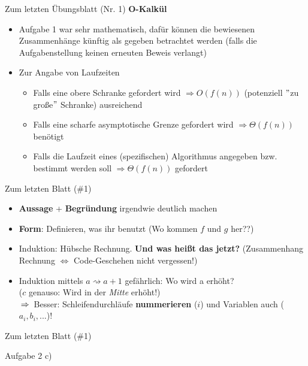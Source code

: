 \begin{frame}{Zum letzten Übungsblatt (Nr. 1)}
	\textbf{O-Kalkül} \\[0,25cm]
	\begin{itemize}
		\item Aufgabe 1 war sehr mathematisch, dafür können die bewiesenen Zusammenhänge künftig als gegeben betrachtet werden (falls die Aufgabenstellung keinen erneuten Beweis verlangt)
		\item Zur Angabe von Laufzeiten
		\begin{itemize}
			\item Falls eine obere Schranke gefordert wird $\Rightarrow O(f(n))$ (potenziell $"$zu große$"$ Schranke) ausreichend
			\item Falls eine scharfe asymptotische Grenze gefordert wird $\Rightarrow \Theta(f(n))$ benötigt
			\item Falls die Laufzeit eines (spezifischen) Algorithmus angegeben bzw. bestimmt werden soll $\Rightarrow \Theta(f(n))$ gefordert
		\end{itemize}
	\end{itemize}
\end{frame}

\fi

\begin{frame}{Zum letzten Blatt (\#1)}
	\begin{itemize}
		\item \textbf{Aussage} + \textbf{Begründung} irgendwie deutlich machen
		\item \textbf{Form}: Definieren, was ihr benutzt (Wo kommen $f$ und $g$ her??)
		\pause
		\item Induktion: Hübsche Rechnung. \textbf{Und was heißt das jetzt?} (Zusammenhang Rechnung $\Leftrightarrow$ Code-Geschehen nicht vergessen!)
		\item Induktion mittels $a \rightsquigarrow a + 1$ gefährlich: Wo wird a erhöht? \\ ($c$ genauso: Wird in der \textit{Mitte} erhöht!) \\
		$\impl$ Besser: Schleifendurchläufe \textbf{nummerieren} ($i$) und Variablen auch ($a_i, b_i,...$)!
	\end{itemize} 
\end{frame}

\begin{frame}{Zum letzten Blatt (\#1)}
	\begin{exampleblock}{Aufgabe 2 c)}
		\begin{algorithm}[H]
		\end{algorithm}
	\end{exampleblock}
\end{frame}

